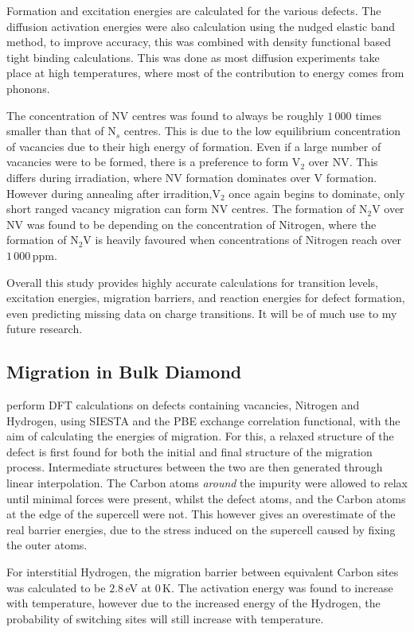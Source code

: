 \documentclass[10pt,a4paper,twocolumn,twoside]{extarticle}
\begin{document}
Formation and excitation energies are calculated for the various defects. The diffusion activation energies were also calculation using the nudged elastic band method, to improve accuracy, this was combined with density functional based tight binding calculations. This was done as most diffusion experiments take place at high temperatures, where most of the contribution to energy comes from phonons. 

The concentration of NV centres was found to always be roughly $1\,000$ times smaller than that of N$_s$ centres. This is due to the low equilibrium concentration of vacancies due to their high energy of formation. Even if a large number of vacancies were to be formed, there is a preference to form V$_2$ over NV. This differs during irradiation, where NV formation dominates over V formation. However during annealing after irradition,V$_2$ once again begins to dominate, only short ranged vacancy migration can form NV centres.
The formation of N$_2$V over NV was found to be depending on the concentration of Nitrogen, where the formation of N$_2$V is heavily favoured when concentrations of Nitrogen reach over $1\,000$\,ppm.

Overall this study provides highly accurate calculations for transition levels, excitation energies, migration barriers, and reaction energies for defect formation, even predicting missing data on charge transitions. It will be of much use to my future research.

\subsection{Migration in Bulk Diamond}
\textcite{butorac} perform DFT calculations on defects containing vacancies, Nitrogen and Hydrogen, using SIESTA and the PBE exchange correlation functional, with the aim of calculating the energies of migration. For this, a relaxed structure of the defect is first found for both the initial and final structure of the migration process. Intermediate structures between the two are then generated through linear interpolation. The Carbon atoms \emph{around} the impurity were allowed to relax until minimal forces were present, whilst the defect atoms, and the Carbon atoms at the edge of the supercell were not. This however gives an overestimate of the real barrier energies, due to the stress induced on the supercell caused by fixing the outer atoms.

For interstitial Hydrogen, the migration barrier between equivalent Carbon sites was calculated to be $2.8$\,eV at $0$\,K. The activation energy was found to increase with temperature, however due to the increased energy of the Hydrogen, the probability of switching sites will still increase with temperature.
\end{document}
